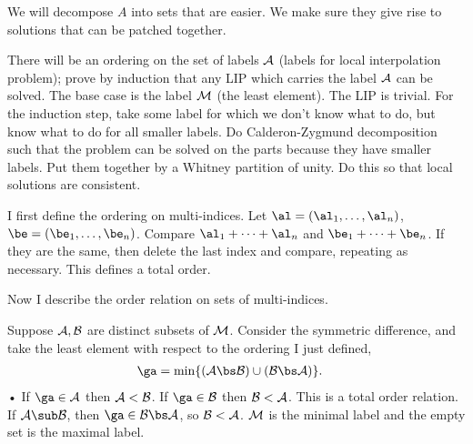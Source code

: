 We will decompose $A$ into sets that are easier. We make sure they give rise to solutions that can be patched together. 

There will be an ordering on the set of labels $\cal A$ (labels for local interpolation problem); prove by induction that any LIP which carries the label $\cal A$ can be solved. The base case is the label $\cal M$ (the least element). The LIP is trivial. For the induction step, take some label for which we don't know what to do, but know what to do for all smaller labels. Do Calderon-Zygmund decomposition such that the problem can be solved on the parts because they have smaller labels. Put them together by a Whitney partition of unity. Do this so that local solutions are consistent. 

I first define the ordering on multi-indices. 
Let $\al=(\al_1,\ldots, \al_n)$, $\be = (\be_1,\ldots, \be_n)$. Compare $\al_1+\cdots +\al_n$ and $\be_1+\cdots + \be_n$. If they are the same, then delete the last index and compare, repeating as necessary. This defines a total order.

Now I describe the order relation on sets of multi-indices.

Suppose $\cal A,\cal B$ are distinct subsets of $\cal M$. Consider the symmetric difference, and take the least element with respect to the ordering I just defined,
\begin{align}
\ga&=\min\{(\cal A\bs \cal B) \cup (\cal B \bs \cal A)\}.
\end{align}•
If $\ga\in \cal A$ then $\cal A<\cal B$. If $\ga\in \cal B$ then $\cal B<\cal A$.
This is a total order relation. If $\cal A\sub \cal B$, then $\ga\in \cal B\bs\cal A$, so $\cal B<\cal A$. $\cal M$ is the minimal label and the empty set is the maximal label. %